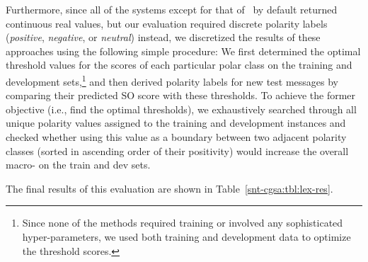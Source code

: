 Furthermore, since all of the systems except for that
of~\citet{Kolchyna:15} by default returned continuous real values, but
our evaluation required discrete polarity labels (\emph{positive},
\emph{negative}, or \emph{neutral}) instead, we discretized the
results of these approaches using the following simple procedure: We
first determined the optimal threshold values for the scores of each
particular polar class on the training and development
sets,\footnote{Since none of the methods required training or involved
  any sophisticated hyper-parameters, we used both training and
  development data to optimize the threshold scores.} and then derived
polarity labels for new test messages by comparing their predicted SO
score with these thresholds.  To achieve the former objective (i.e.,
find the optimal thresholds), we exhaustively searched through all
unique polarity values assigned to the training and development
instances and checked whether using this value as a boundary between
two adjacent polarity classes (sorted in ascending order of their
positivity) would increase the overall macro-\F{} on the train and dev
sets.

The final results of this evaluation are shown in
Table~\ref{snt-cgsa:tbl:lex-res}.


